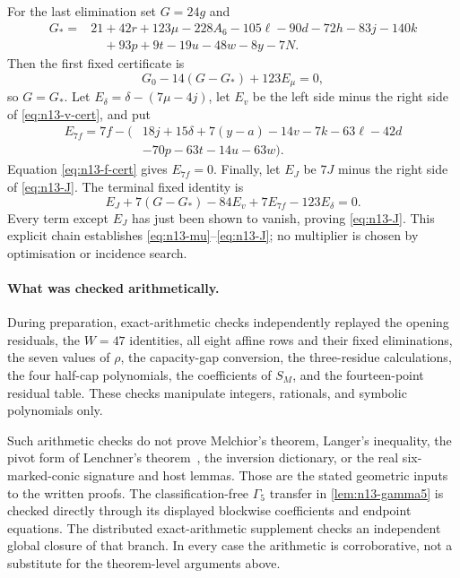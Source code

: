 For the last elimination set $G=24g$ and
\begin{align*}
 G_*={}&21+42r+123\mu-228A_6-105\ell-90d-72h-83j-140k\\
      &\quad+93p+9t-19u-48w-8y-7N.
\end{align*}
Then the first fixed certificate is
\begin{equation}
 G_0-14(G-G_*)+123E_\mu=0,                          \label{eq:n13-Gstar}
\end{equation}
so $G=G_*$.  Let $E_\delta=\delta-(7\mu-4j)$, let $E_v$ be the left side
minus the right side of \eqref{eq:n13-v-cert}, and put
\begin{align*}
 E_{7f}=7f-\bigl(&18j+15\delta+7(y-a)-14v-7k-63\ell-42d\\
                 &-70p-63t-14u-63w\bigr).
\end{align*}
Equation \eqref{eq:n13-f-cert} gives $E_{7f}=0$.  Finally, let $E_J$ be
$7J$ minus the right side of \eqref{eq:n13-J}.  The terminal fixed
identity is
\begin{equation}
 E_J+7(G-G_*)-84E_v+7E_{7f}-123E_\delta=0.          \label{eq:n13-EJ}
\end{equation}
Every term except $E_J$ has just been shown to vanish, proving
\eqref{eq:n13-J}.  This explicit chain establishes
\eqref{eq:n13-mu}--\eqref{eq:n13-J}; no multiplier is chosen by
optimisation or incidence search.

\paragraph{What was checked arithmetically.}
During preparation, exact-arithmetic checks independently replayed the
opening residuals, the $W=47$
identities, all eight affine rows and their fixed eliminations, the seven
values of $\rho$, the capacity-gap conversion, the three-residue
calculations, the four half-cap polynomials, the coefficients of $S_M$, and
the fourteen-point residual table.  These checks manipulate integers, rationals,
and symbolic polynomials only.

Such arithmetic checks do not prove Melchior's theorem, Langer's inequality, the pivot form
of Lenchner's theorem~\cite{Lenchner2007}, the inversion dictionary, or the
real six-marked-conic signature and host lemmas.  Those are the stated
geometric inputs to the written proofs.  The classification-free
$\Gamma_5$ transfer in \cref{lem:n13-gamma5} is checked directly through
its displayed blockwise coefficients and endpoint equations.  The distributed
exact-arithmetic supplement
 checks an independent
global closure of that branch.  In every case the arithmetic is
corroborative, not a substitute for the theorem-level arguments above.
